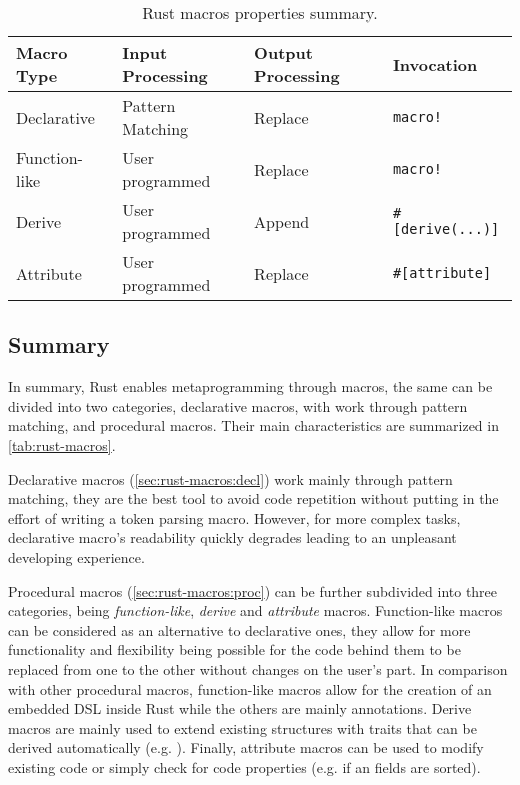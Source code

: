 \begin{table}
    \centering
    \begin{tabular}{l|l|l|l}
        Macro Type    & Input Processing & Output Processing & Invocation                 \\
        \hline
        Declarative   & Pattern Matching & Replace           & \texttt{macro!}            \\
        Function-like & User programmed  & Replace           & \texttt{macro!}            \\
        Derive        & User programmed  & Append            & \texttt{\#{[}derive(...)]} \\
        Attribute     & User programmed  & Replace           & \texttt{\#{[}attribute]}
    \end{tabular}
    \caption{Rust macros properties summary.}
    \label{tab:rust-macros}
\end{table}

\subsection{Summary}
In summary, Rust enables metaprogramming through macros, the same can be divided into two categories,
declarative macros, with work through pattern matching, and procedural macros.
Their main characteristics are summarized in \autoref{tab:rust-macros}.

Declarative macros (\autoref{sec:rust-macros:decl}) work mainly through pattern matching,
they are the best tool to avoid code repetition without putting in the effort of writing a token parsing macro.
However, for more complex tasks, declarative macro's readability quickly degrades leading to an unpleasant developing experience.

Procedural macros (\autoref{sec:rust-macros:proc}) can be further subdivided into three categories,
being \emph{function-like}, \emph{derive} and \emph{attribute} macros.
Function-like macros can be considered as an alternative to declarative ones,
they allow for more functionality and flexibility being possible for the code behind them
to be replaced from one to the other without changes on the user's part.
In comparison with other procedural macros, function-like macros allow for the creation of an embedded DSL inside Rust while the others are mainly annotations.
Derive macros are mainly used to extend existing structures with traits that can be derived automatically (e.g. ).
Finally, attribute macros can be used to modify existing code or simply check for code properties (e.g. if an  fields are sorted).

